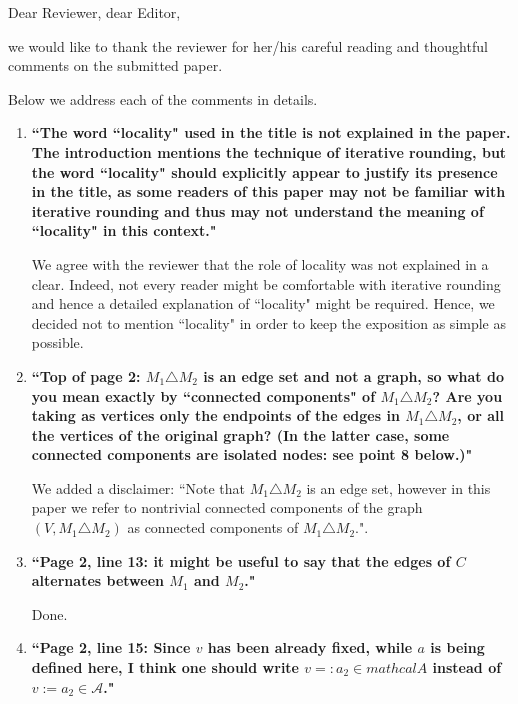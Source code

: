 \documentclass[11pt]{article}
\begin{document}
Dear Reviewer, dear Editor,

\bigskip

we would like to thank the reviewer for her/his careful reading and thoughtful comments on the submitted paper. 

Below we address each of the comments in details.

\begin{enumerate}
	\item \textbf{``The word ``locality" used in the title is not explained in the paper. The introduction mentions the technique of iterative rounding, but the word ``locality" should explicitly appear to justify its presence in the title, as some readers of this paper may not be familiar with iterative rounding and thus may not understand the meaning of ``locality" in this context."}
	
	\smallskip
	
	We agree with the reviewer that the role of locality was not explained in a clear. Indeed, not every reader might be comfortable with iterative rounding and hence a detailed explanation of ``locality" might be required. Hence, we decided not to mention ``locality" in order to keep the exposition as simple as possible.
	
	\bigskip
	
	\item  \textbf{``Top of page 2: $M_1\triangle M_2$ is an edge set and not a graph, so what do you mean exactly by ``connected components" of $M_1\triangle M_2$? Are you taking as vertices only the endpoints
of the edges in $M_1\triangle M_2$, or all the vertices of the original graph? (In the latter case,
some connected components are isolated nodes: see point 8 below.)"}
	
	\smallskip
	
	We added a disclaimer: ``Note that $M_1\triangle M_2$ is an edge set, however in this paper we refer to nontrivial connected components of the graph $(V, M_1\triangle M_2)$ as connected components of $M_1\triangle M_2$.".
	
	\bigskip

	\item  \textbf{``Page 2, line 13: it might be useful to say that the edges of $C$ alternates between $M_1$
and $M_2$."}
	
	\smallskip
	
	Done.
	
	\bigskip
	
	\item \textbf{``Page 2, line 15: Since $v$ has been already fixed, while $a$ is being defined here, I think
one should write $v =: a_2 \in mathcal{A}$ instead of $v := a_2\in \mathcal{A}$."}
	

\end{enumerate}
\end{document}
